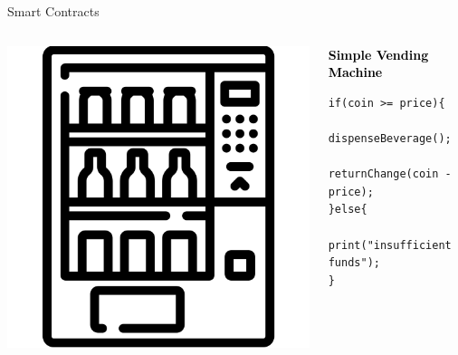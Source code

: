 \documentclass[handout]{beamer}
\begin{document}
\begin{frame}[fragile]{Smart Contracts}
	\begin{columns}
		\begin{column}{0.3\textwidth}
			\includegraphics[width=1\textwidth]{../assets/images/vending-machine.png}
		\end{column}
		\begin{column}{0.5\textwidth}
			\begin{block}{\textcolor{black}{\textbf{Simple Vending Machine}}}
				\begin{lstlisting}[firstnumber=1,  xleftmargin=0pt, columns=fullflexible,language=Solidity] 
if(coin >= price){
	dispenseBeverage();
	returnChange(coin - price);
}else{
	print("insufficient funds");
}
				\end{lstlisting}
			\end{block}
		\end{column}
	\end{columns}
	\vspace{0.5cm}
\end{frame}
\end{document}
